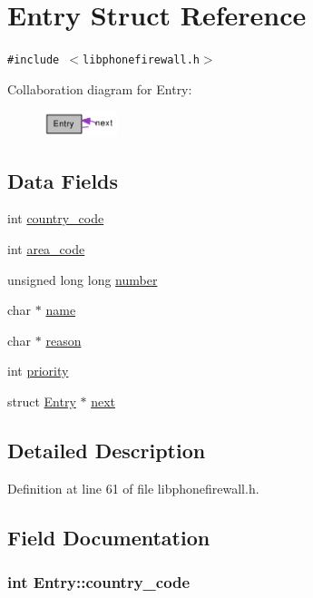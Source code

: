 \hypertarget{structEntry}{
\section{Entry Struct Reference}
\label{structEntry}
}
{\tt \#include $<$libphonefirewall.h$>$}

Collaboration diagram for Entry:\nopagebreak
\begin{figure}[H]
\begin{center}
\leavevmode
\includegraphics[width=61pt]{structEntry__coll__graph}
\end{center}
\end{figure}
\subsection*{Data Fields}
\begin{CompactItemize}
\item 
int \hyperlink{structEntry_138b4e79687ff5ff6de4554db0f061fd}{country\_\-code}
\item 
int \hyperlink{structEntry_9de7b96e5b65796bd35e9dc730dcd8b3}{area\_\-code}
\item 
unsigned long long \hyperlink{structEntry_1f2177afed89936f82c130ae13fb107c}{number}
\item 
char $\ast$ \hyperlink{structEntry_272e382d3efed5f970c7939742ec9603}{name}
\item 
char $\ast$ \hyperlink{structEntry_2082cdbb815dfa8b81309cd395d32986}{reason}
\item 
int \hyperlink{structEntry_85af261b3171c257892b54a7200da061}{priority}
\item 
struct \hyperlink{structEntry}{Entry} $\ast$ \hyperlink{structEntry_08cba741f383cd7da0f3ab9aee6e3cd5}{next}
\end{CompactItemize}


\subsection{Detailed Description}


Definition at line 61 of file libphonefirewall.h.

\subsection{Field Documentation}
\hypertarget{structEntry_138b4e79687ff5ff6de4554db0f061fd}{
\subsubsection{\setlength{\rightskip}{0pt plus 5cm}int {\bf Entry::country\_\-code}}}
\label{structEntry_138b4e79687ff5ff6de4554db0f061fd}




